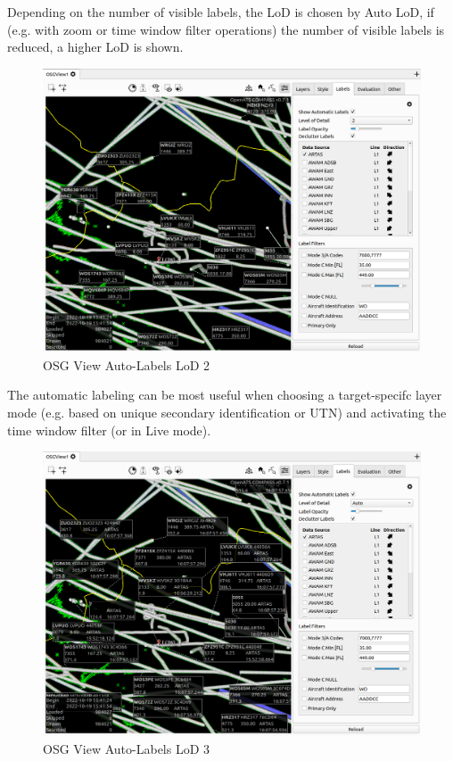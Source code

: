 Depending on the number of visible labels, the LoD is chosen by Auto LoD, if (e.g. with zoom or time window filter operations) the number of visible labels is reduced, a higher LoD is shown.

\begin{figure}[H]
    \hspace*{-2.5cm}
    \includegraphics[width=19cm,frame]{figures/osgview_label_lod2.png}
  \caption{OSG View Auto-Labels LoD 2}
\end{figure}

The automatic labeling can be most useful when choosing a target-specifc layer mode (e.g. based on unique secondary identification or UTN) and activating the time window filter (or in Live mode).

\begin{figure}[H]
    \hspace*{-2.5cm}
    \includegraphics[width=19cm,frame]{figures/osgview_label_lod3.png}
  \caption{OSG View Auto-Labels LoD 3}
\end{figure}


